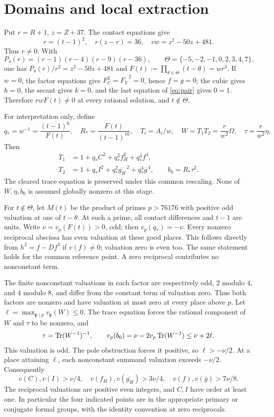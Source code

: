 \documentclass[11pt,a4paper]{article}
\begin{document}
\section{Domains and local extraction}
Put $r=R+1$, $z=Z+37$. The contact equations give
\[
 r=(t-1)^2,\quad r(z-r)=36,\quad rw=z^2-50z+481.
\]
Thus $r\ne0$. With
\[
 P_4(r)=(r-1)(r-4)(r-9)(r-36),\qquad
 \Theta=\{-5,-2,-1,0,2,3,4,7\},
\]
one has $P_4(r)/r^2=z^2-50z+481$ and
$F(t):=\prod_{\theta\in\Theta}(t-\theta)=wr^3$.
If $w=0$, the factor equations give $F_U^2=\overline{F_V}^{\,2}=0$,
hence $f=g=0$; the cubic gives $h=0$, the secant gives $k=0$, and
the last equation of \eqref{eq:pair} gives $0=1$. Therefore
$r w F(t)\ne0$ at every rational solution, and $t\notin\Theta$.

For interpretation only, define
\[
 q_* =w^{-1}=\frac{(t-1)^6}{F(t)},\quad
 R_* =\frac{F(t)}{(t-1)^{10}},\quad
 T_i=A_i/w,\quad W=T_1T_2=\frac r{w^2}\Omega,
 \quad\tau=\frac r{w^2}\eta.
\]
Then
\begin{align*}
T_1&=1+q_*C^2+q_*^2 f_H^2+q_*^4f^4,\\
T_2&=1+q_*I^2+q_*^2\overline{g_H}^{\,2}+q_*^4\overline g^{\,4},
\qquad b_0=R_*\tau^2.
\end{align*}
The cleared trace equation is preserved under this common rescaling.
None of $W,\eta,b_0$ is assumed globally nonzero at this stage.

For $t\notin\Theta$, let $M(t)$ be the product of primes $p>76176$
with positive odd valuation at one of $t-\theta$. At such a prime,
all contact differences and $t-1$ are units. Write
$\nu=v_p(F(t))>0$, odd; then $v_p(q_*)=-\nu$.
Every nonzero reciprocal abscissa has even valuation at these good
places. This follows directly from $h^2=f-Df^3$ if $v(f)\ne0$;
valuation zero is even too. The same statement holds for the common
reference point. A zero reciprocal contributes no nonconstant term.

The finite nonconstant valuations in each factor are respectively
odd, $2$ modulo $4$, and $4$ modulo $8$, and differ from the
constant term of valuation zero. Thus both factors are nonzero and
have valuation at most zero at every place above $p$. Let
$\ell=\max_{\mathfrak p\mid p}v_{\mathfrak p}(W)\le0$.
The trace equation forces the rational component of $W$ and $\tau$
to be nonzero, and
\[
 \tau=\operatorname{Tr}(W^{-1})^{-1},\qquad
 v_p(b_0)=\nu-2v_p\operatorname{Tr}(W^{-1})\le\nu+2\ell.
\]
This valuation is odd. The pole obstruction forces it positive, so
$\ell>-\nu/2$. At a place attaining $\ell$, each nonconstant
summand valuation exceeds $-\nu/2$. Consequently
\[
 v(C),v(I)>\nu/4,\quad
 v(f_H),v(\overline{g_H})>3\nu/4,\quad
 v(f),v(\overline g)>7\nu/8.
\]
The reciprocal valuations are positive even integers, and $C,I$
have order at least one. In particular the four indicated points are
in the appropriate primary or conjugate formal groups, with the
identity convention at zero reciprocals.
\end{document}
